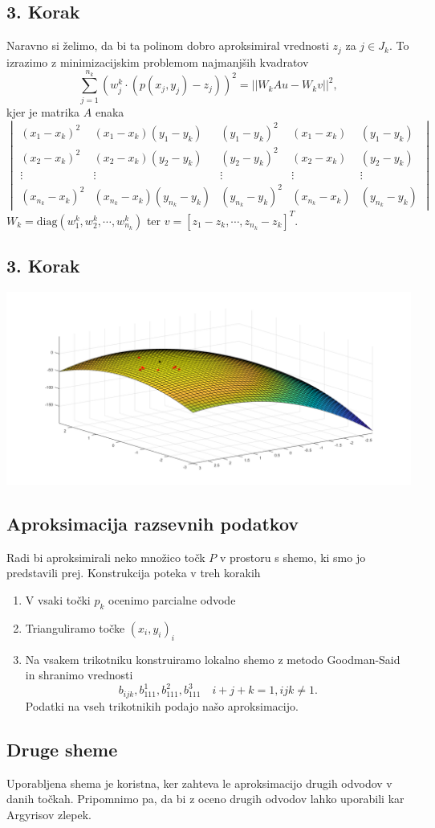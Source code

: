 \documentclass[ignorenonframetext]{beamer}
\let\frametitle\subsection %
\begin{document}
\begin{frame}
\frametitle{3. Korak}
Naravno si želimo, da bi ta polinom dobro aproksimiral vrednosti $z_j$ za $j \in J_k$. 
To izrazimo z minimizacijskim problemom najmanjših kvadratov
$$\sum_{j =1}^{n_k} (w^k_j \cdot (p(x_j,y_j) - z_j))^2 = ||W_kAu - W_kv||^2,$$
kjer je matrika $A$ enaka
\begin{equation*}
\begin{vmatrix}
(x_1 - x_k)^2 &  (x_1 - x_k) (y_1 - y_k) & (y_1 - y_k)^2 & (x_1 - x_k) & (y_1 - y_k) \\
(x_2 - x_k)^2 &  (x_2 - x_k) (y_2 - y_k) & (y_2 - y_k)^2 & (x_2 - x_k) & (y_2 - y_k) \\
\vdots & \vdots & \vdots & \vdots & \vdots \\
(x_{n_k} - x_k)^2 & (x_{n_k} - x_k) (y_{n_k} - y_k) & (y_{n_k} - y_k)^2 & (x_{n_k} - x_k) & (y_{n_k} - y_k)
\end{vmatrix}
\end{equation*}
$W_k = \text{diag}(w^k_1, w^k_2, \cdots, w^k_{n_k})$ ter $v = [z_1 - z_k, \cdots, z_{n_k} - z_k]^T$.
\end{frame}

\begin{frame}
\frametitle{3. Korak}
\includegraphics[width=\textwidth, height=\textheight]{slike/surfInterpol.png}
\end{frame}

\begin{frame}
\frametitle{Aproksimacija razsevnih podatkov}
Radi bi aproksimirali neko množico točk $P$ v prostoru s shemo, ki smo jo predstavili prej.
Konstrukcija poteka v treh korakih
\begin{enumerate}
\item V vsaki točki $p_k$ ocenimo parcialne odvode
\item Trianguliramo točke $(x_i,y_i)_i$
\item Na vsakem trikotniku konstruiramo lokalno shemo z metodo Goodman-Said in shranimo vrednosti 
$$b_{ijk}, b_{111}^1, b_{111}^2, b_{111}^3 \quad i + j + k = 1, ijk \neq 1.$$
Podatki na vseh trikotnikih podajo našo aproksimacijo.
\end{enumerate}

\end{frame}

\begin{frame}
\frametitle{Druge sheme}
Uporabljena shema je koristna, ker zahteva le aproksimacijo drugih odvodov v danih točkah.
Pripomnimo pa, da bi z oceno drugih odvodov lahko uporabili kar Argyrisov zlepek.
\end{frame}
\end{document}
